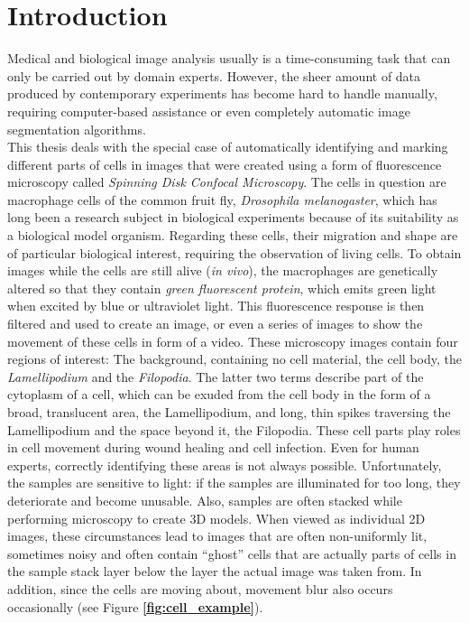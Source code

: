 \chapter{Introduction}
Medical and biological image analysis usually is a time-consuming task that can only be carried out by domain experts. However, the sheer amount of data produced by contemporary experiments has become hard to handle manually, requiring computer-based assistance or even completely automatic image segmentation algorithms.\\

\noindent This thesis deals with the special case of automatically identifying and marking different parts of cells in images that were created using a form of fluorescence microscopy called \textit{Spinning Disk Confocal Microscopy}. The cells in question are macrophage cells of the common fruit fly, \textit{Drosophila melanogaster}, which has long been a research subject in biological experiments because of its suitability as a biological model organism. Regarding these cells, their migration and shape are of particular biological interest, requiring the observation of living cells. To obtain images while the cells are still alive (\textit{in vivo}), the macrophages are genetically altered so that they contain \textit{green fluorescent protein}, which emits green light when excited by blue or ultraviolet light. This fluorescence response is then filtered and used to create an image, or even a series of images to show the movement of these cells in form of a video. These microscopy images contain four regions of interest: The background, containing no cell material, the cell body, the \textit{Lamellipodium} and the \textit{Filopodia}. The latter two terms describe part of the cytoplasm of a cell, which can be exuded from the cell body in the form of a broad, translucent area, the Lamellipodium, and long, thin spikes traversing the Lamellipodium and the space beyond it, the Filopodia. These cell parts play roles in cell movement during wound healing and cell infection. Even for human experts, correctly identifying these areas is not always possible. Unfortunately, the samples are sensitive to light: if the samples are illuminated for too long, they deteriorate and become unusable. Also, samples are often stacked while performing microscopy to create 3D models. When viewed as individual 2D images, these circumstances lead to images that are often non-uniformly lit, sometimes noisy and often contain ``ghost'' cells that are actually parts of cells in the sample stack layer below the layer the actual image was taken from. In addition, since the cells are moving about, movement blur also occurs occasionally (see Figure \textbf{\ref{fig:cell_example}}). \cite{bioimage, bioimage2}

